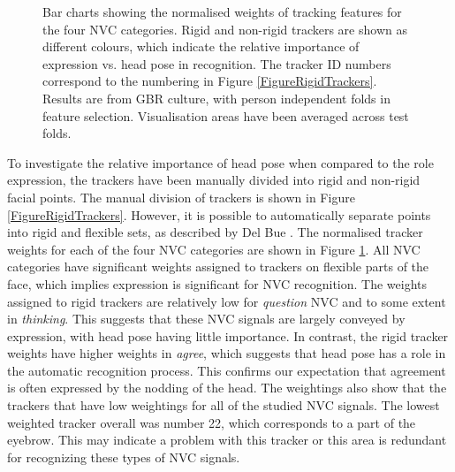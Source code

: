 \begin{figure}[tb]
\begin{tabular}{ cc }
\end{tabular}
\caption[Bar charts showing the normalised weights of tracking features for the four \ac{NVC} categories.]{Bar charts showing the normalised weights of tracking features for the four \ac{NVC} categories. Rigid and non-rigid trackers are shown as different colours, which indicate the relative importance of expression vs. head pose in recognition. The tracker ID numbers correspond to the numbering in Figure \ref{FigureRigidTrackers}. Results are from GBR culture, with person independent folds in feature selection. Visualisation areas have been averaged across test folds.}
\label{FigureFeatureWeightBarCharts}
\end{figure}

To investigate the relative importance of head pose when compared to the role expression, the trackers have been manually divided into rigid and non-rigid facial points. The manual division of trackers is shown in Figure \ref{FigureRigidTrackers}. However, it is possible to automatically separate points into rigid and flexible sets, as described by Del Bue \etal \cite{DelBue2005}. The normalised tracker weights for each of the four \ac{NVC} categories are shown in Figure \ref{FigureFeatureWeightBarCharts}. All \ac{NVC} categories have significant weights assigned to trackers on flexible parts of the face, which implies expression is significant for \ac{NVC} recognition. The weights assigned to rigid trackers are relatively low for \textit{question} \ac{NVC} and to some extent in \textit{thinking}. This suggests that these \ac{NVC} signals are largely conveyed by expression, with head pose having little importance. In contrast, the rigid tracker weights have higher weights in \textit{agree}, which suggests that head pose has a role in the automatic recognition process. This confirms our expectation that agreement is often expressed by the nodding of the head. The weightings also show that the trackers that have low weightings for all of the studied \ac{NVC} signals. The lowest weighted tracker overall was number 22, which corresponds to a part of the eyebrow. This may indicate a problem with this tracker or this area is redundant for recognizing these types of \ac{NVC} signals.


